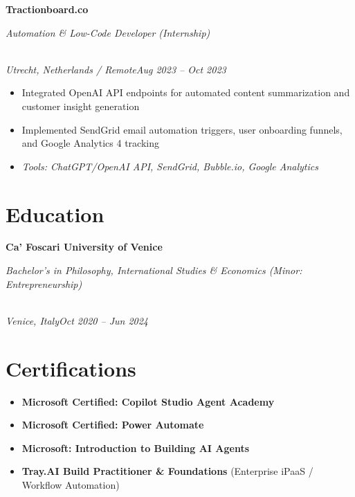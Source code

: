 \documentclass[a4paper,10pt]{article}
\newcommand{\role}[4]{\vspace{2pt}\noindent\hspace{0.6em}\parbox[t]{0.38\textwidth}{\raggedright\textbf{#1}}\hfill\parbox[t]{0.58\textwidth}{\raggedleft\textit{#2}}\\{\textit{#3}\hfill\textit{#4}}\vspace{1pt}}
\begin{document}
\role{Tractionboard.co}{Automation \& Low-Code Developer (Internship)}{Utrecht, Netherlands / Remote}{Aug 2023 -- Oct 2023}
\begin{itemize}
\item Integrated OpenAI API endpoints for automated content summarization and customer insight generation
\item Implemented SendGrid email automation triggers, user onboarding funnels, and Google Analytics 4 tracking
\item \textit{Tools: ChatGPT/OpenAI API, SendGrid, Bubble.io, Google Analytics}
\end{itemize}

\section{Education}
\role{Ca' Foscari University of Venice}{Bachelor's in Philosophy, International Studies \& Economics (Minor: Entrepreneurship)}{Venice, Italy}{Oct 2020 -- Jun 2024}

\section{Certifications}
\begin{itemize}
\item \textbf{Microsoft Certified: Copilot Studio Agent Academy}
\item \textbf{Microsoft Certified: Power Automate}
\item \textbf{Microsoft: Introduction to Building AI Agents}
\item \textbf{Tray.AI Build Practitioner \& Foundations} (Enterprise iPaaS / Workflow Automation)
\end{itemize}
\end{document}
